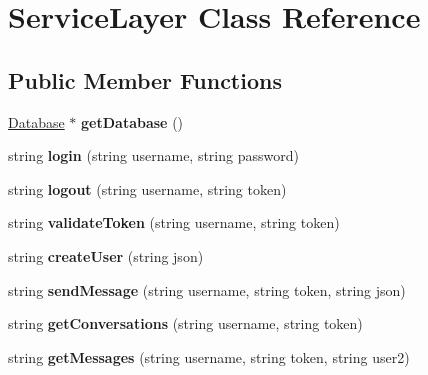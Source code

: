 \hypertarget{classServiceLayer}{\section{Service\-Layer Class Reference}
\label{classServiceLayer}
}
\subsection*{Public Member Functions}
\begin{DoxyCompactItemize}
\item 
\hypertarget{classServiceLayer_a5c564934fe9abbc2d0106f84641d1636}{\hyperlink{classDatabase}{Database} $\ast$ {\bfseries get\-Database} ()}\label{classServiceLayer_a5c564934fe9abbc2d0106f84641d1636}

\item 
\hypertarget{classServiceLayer_a156db9a26ee9c18b5dc004a53e6db135}{string {\bfseries login} (string username, string password)}\label{classServiceLayer_a156db9a26ee9c18b5dc004a53e6db135}

\item 
\hypertarget{classServiceLayer_aa58f32a68f65731f5bff417a6d8587cd}{string {\bfseries logout} (string username, string token)}\label{classServiceLayer_aa58f32a68f65731f5bff417a6d8587cd}

\item 
\hypertarget{classServiceLayer_a3158abab790bb26288e3d42529044c47}{string {\bfseries validate\-Token} (string username, string token)}\label{classServiceLayer_a3158abab790bb26288e3d42529044c47}

\item 
\hypertarget{classServiceLayer_ae7b18cf7b281a5e97fe291202865bf24}{string {\bfseries create\-User} (string json)}\label{classServiceLayer_ae7b18cf7b281a5e97fe291202865bf24}

\item 
\hypertarget{classServiceLayer_a8b160670006abd96a72634c021ff171f}{string {\bfseries send\-Message} (string username, string token, string json)}\label{classServiceLayer_a8b160670006abd96a72634c021ff171f}

\item 
\hypertarget{classServiceLayer_a7b502342d937cb644ad8fa077cf4c563}{string {\bfseries get\-Conversations} (string username, string token)}\label{classServiceLayer_a7b502342d937cb644ad8fa077cf4c563}

\item 
\hypertarget{classServiceLayer_a3d5142f67a7d93a9b190c742772033d1}{string {\bfseries get\-Messages} (string username, string token, string user2)}\label{classServiceLayer_a3d5142f67a7d93a9b190c742772033d1}


\end{DoxyCompactItemize}
